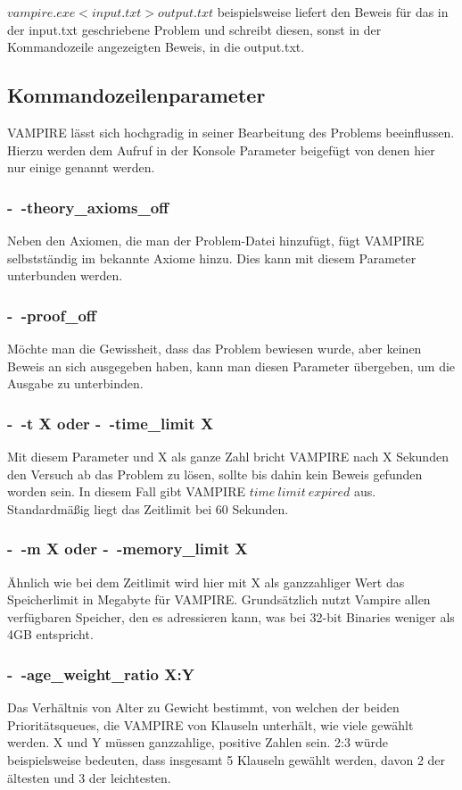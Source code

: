 \documentclass{article}
\begin{document}
$ vampire.exe < input.txt > output.txt $ beispielsweise liefert den Beweis für das in der input.txt geschriebene Problem und schreibt diesen, sonst in der Kommandozeile angezeigten Beweis, in die output.txt.

\subsection{Kommandozeilenparameter}
\label{subsec:commands}
VAMPIRE lässt sich hochgradig in seiner Bearbeitung des Problems beeinflussen. Hierzu werden dem Aufruf in der Konsole Parameter beigefügt von denen hier nur einige genannt werden.

\subsubsection{-~-theory\_axioms\_off}
\label{subsubsec: commandtheoryaxiomsoff}
Neben den Axiomen, die man der Problem-Datei hinzufügt, fügt VAMPIRE selbstständig im bekannte Axiome hinzu. Dies kann mit diesem Parameter unterbunden werden.
\subsubsection{-~-proof\_off}
\label{subsubsec: commandproofoff}
Möchte man die Gewissheit, dass das Problem bewiesen wurde, aber keinen Beweis an sich ausgegeben haben, kann man diesen Parameter übergeben, um die Ausgabe zu unterbinden.
\subsubsection{-~-t X oder -~-time\_limit X}
\label{subsubsec: commandtimelimit}
Mit diesem Parameter und X als ganze Zahl bricht VAMPIRE nach X Sekunden den Versuch ab das Problem zu lösen, sollte bis dahin kein Beweis gefunden worden sein.
In diesem Fall gibt VAMPIRE $time~limit~expired$ aus. Standardmäßig liegt das Zeitlimit bei 60  Sekunden.
\subsubsection{-~-m X oder -~-memory\_limit X}
\label{subsubsec: commandmemorylimit}
Ähnlich wie bei dem Zeitlimit wird hier mit X als ganzzahliger Wert das Speicherlimit in Megabyte für VAMPIRE. Grundsätzlich nutzt Vampire allen verfügbaren Speicher, den es adressieren kann, was bei 32-bit Binaries weniger als 4GB entspricht.
\subsubsection{-~-age\_weight\_ratio X:Y}
\label{subsubsec: commandageweightratio}
Das Verhältnis von Alter zu Gewicht bestimmt, von welchen der beiden Prioritätsqueues, die VAMPIRE von Klauseln unterhält, wie viele gewählt werden. X und Y müssen ganzzahlige, positive Zahlen sein.
2:3 würde beispielsweise bedeuten, dass insgesamt 5 Klauseln gewählt werden, davon 2 der ältesten und 3 der leichtesten. 
\end{document}
